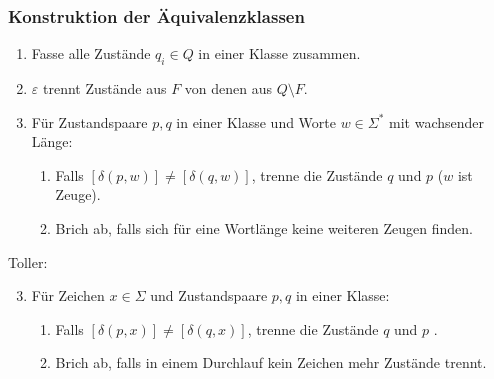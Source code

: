 \begin{frame}
 \frametitle{Konstruktion der Äquivalenzklassen}
 \begin{block}{}
  \begin{enumerate}
   \item Fasse alle Zustände $q_i \in Q$ in einer Klasse zusammen.
   \item $\varepsilon$ trennt Zustände aus $F$ von denen aus $Q \setminus F$.
   \item Für Zustandspaare $p, q$ in einer Klasse und
   Worte $w\in \Sigma^*$ mit wachsender Länge: 
    \begin{enumerate}
    \item Falls $[\delta(p, w)] \neq [\delta(q, w)]$, trenne die Zustände $q$ und $p$ ($w$ ist Zeuge).
    \item Brich ab, falls sich für eine Wortlänge keine weiteren Zeugen finden.
    \end{enumerate}
  \end{enumerate}
 \end{block}
 \pause
 \begin{block}{Toller:}
   \begin{enumerate}
    \setcounter{enumi}{2}
    \item Für Zeichen $x \in \Sigma$ und Zustandspaare $p, q$ in einer Klasse:
     \begin{enumerate}
     \item Falls $[\delta(p, x)] \neq [\delta(q, x)]$, trenne die Zustände $q$ und $p$ .
     \item Brich ab, falls in einem Durchlauf kein Zeichen mehr Zustände trennt.
     \end{enumerate}
   \end{enumerate}
  \end{block}
\end{frame}
